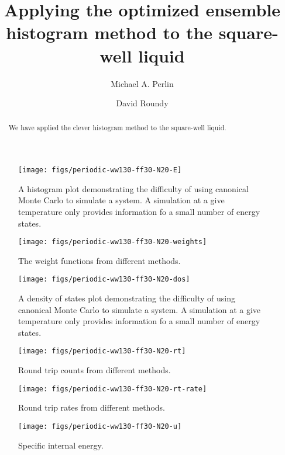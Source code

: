 \documentclass[letterpaper,twocolumn,amsmath,amssymb,pre,aps,10pt]{revtex4-1}
\begin{document}
\title{Applying the optimized ensemble histogram method to the
  square-well liquid}

\author{Michael A. Perlin} \author{David Roundy}

\begin{abstract}
  We have applied the clever histogram method to the square-well
  liquid.
\end{abstract}

\maketitle

\begin{figure}
  \texttt{[image: figs/periodic-ww130-ff30-N20-E]}
  \caption{A histogram plot demonstrating the difficulty of using
    canonical Monte Carlo to simulate a system.  A simulation at a
    give temperature only provides information fo a small number of
    energy states.\label{fig:histograms}}
\end{figure}

\begin{figure}
  \texttt{[image: figs/periodic-ww130-ff30-N20-weights]}
  \caption{The weight functions from different methods.}
\end{figure}

\begin{figure}
  \texttt{[image: figs/periodic-ww130-ff30-N20-dos]}
  \caption{A density of states plot demonstrating the difficulty of
    using canonical Monte Carlo to simulate a system.  A simulation at
    a give temperature only provides information fo a small number of
    energy states.\label{fig:dos}}
\end{figure}

\begin{figure}
  \texttt{[image: figs/periodic-ww130-ff30-N20-rt]}
  \caption{Round trip counts from different methods.}
\end{figure}

\begin{figure}
  \texttt{[image: figs/periodic-ww130-ff30-N20-rt-rate]}
  \caption{Round trip rates from different methods.}
\end{figure}

\begin{figure}
  \texttt{[image: figs/periodic-ww130-ff30-N20-u]}
  \caption{Specific internal energy.\label{fig:u}}
\end{figure}
\end{document}
